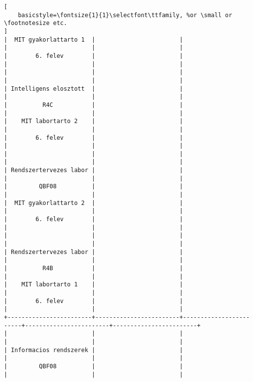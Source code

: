 \begin{lstlisting}[
    basicstyle=\fontsize{1}{1}\selectfont\ttfamily, %or \small or \footnotesize etc.
]
|  MIT gyakorlattarto 1  |                        |                        |                        |                        | 
|        6. felev        |                        |                        |                        |                        | 
|                        |                        |                        |                        |                        | 
| Intelligens elosztott  |                        |                        |                        |                        | 
|          R4C           |                        |                        |                        |                        | 
|    MIT labortarto 2    |                        |                        |                        |                        | 
|        6. felev        |                        |                        |                        |                        | 
|                        |                        |                        |                        |                        | 
| Rendszertervezes labor |                        |                        |                        |                        | 
|         QBF08          |                        |                        |                        |                        | 
|  MIT gyakorlattarto 2  |                        |                        |                        |                        | 
|        6. felev        |                        |                        |                        |                        | 
|                        |                        |                        |                        |                        | 
| Rendszertervezes labor |                        |                        |                        |                        | 
|          R4B           |                        |                        |                        |                        | 
|    MIT labortarto 1    |                        |                        |                        |                        | 
|        6. felev        |                        |                        |                        |                        | 
+------------------------+------------------------+------------------------+------------------------+------------------------+
|                        |                        |                        |                        |                        | 
| Informacios rendszerek |                        |                        |                        |                        | 
|         QBF08          |                        |                        |                        |                        | 

\end{lstlisting}
